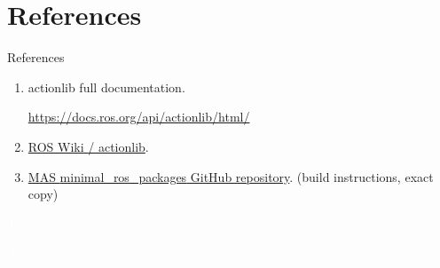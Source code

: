 \documentclass{beamer}
\begin{document}
\section{References}
\begin{frame}{References}

    \begin{enumerate}
        \item actionlib full documentation.

        \url{https://docs.ros.org/api/actionlib/html/}
        
        \item \href{http://wiki.ros.org/actionlib}{ROS Wiki {\scriptsize/ actionlib}}. 
        
        \item \href{https://github.com/mas-group/minimal_ros_packages/tree/master/srv_minimal}{MAS {\ttfamily \colorbox{gray!30!white}{minimal\_ros\_packages}} GitHub repository}. {\tiny(build instructions, exact copy) }       

    \end{enumerate}
\end{frame}



\begin{frame}[plain]{}  
    \centering
    {\huge \textcolor{white}{Thank you}}
    
    \vspace{0.5cm}
    
    {\huge \textcolor{white}{Any questions?}}
\end{frame}
\end{document}
